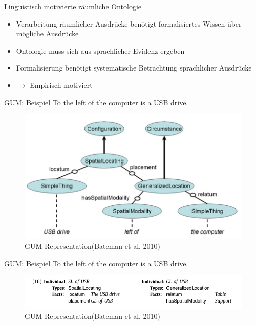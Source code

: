 \documentclass[12pt,a4paper]{beamer}
\begin{document}
\begin{frame}{Linguistisch motivierte räumliche Ontologie}
\begin{itemize}
\item Verarbeitung räumlicher Ausdrücke benötigt formalisiertes Wissen über mögliche Ausdrücke
\item Ontologie muss sich aus sprachlicher Evidenz ergeben
\item Formalisierung benötigt systematische Betrachtung sprachlicher Ausdrücke
\item $\to$ Empirisch motiviert
\end{itemize}
\end{frame}



\begin{frame}{GUM: Beispiel}
To the left of the computer is a USB drive.
\begin{figure}
\includegraphics[scale=0.45]{img/2010_fig3.png}
\caption{GUM Representation(Bateman et al, 2010)}
\end{figure}
\end{frame}


\begin{frame}{GUM: Beispiel}
To the left of the computer is a USB drive.
\begin{figure}
\includegraphics[scale=0.6]{img/2010_gl_of_usb.png}
\caption{GUM Representation(Bateman et al, 2010)}
\end{figure}
\end{frame}
\end{document}
